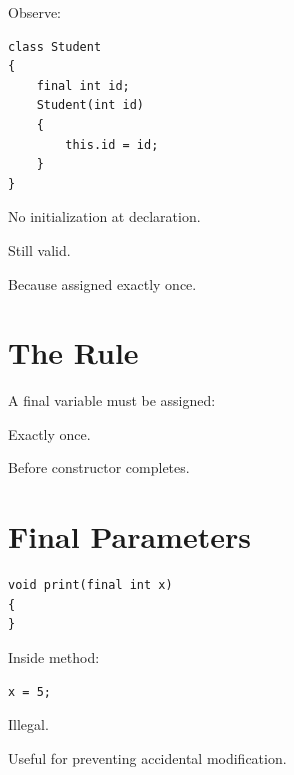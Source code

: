 \documentclass[11pt,a4paper]{book}
\begin{document}
Observe:

\begin{verbatim}
class Student
{
    final int id;
    Student(int id)
    {
        this.id = id;
    }
}
\end{verbatim}


No initialization at declaration.


Still valid.


Because assigned exactly once.


\section{The Rule}

A final variable must be assigned:


Exactly once.


Before constructor completes.


\section{Final Parameters}

\begin{verbatim}
void print(final int x)
{
}
\end{verbatim}


Inside method:

\begin{verbatim}
x = 5;
\end{verbatim}


Illegal.


Useful for preventing accidental modification.
\end{document}
